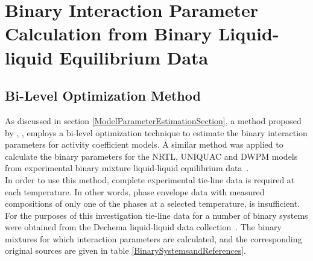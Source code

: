 
\section{Binary Interaction Parameter Calculation from Binary Liquid-liquid Equilibrium Data}
\subsection{Bi-Level Optimization Method}
								
As discussed in section \ref{ModelParameterEstimationSection}, a method proposed by \citeauthor{BilevelOptimization2}, \citeyear{BilevelOptimization2}, employs a bi-level optimization technique to estimate the binary interaction parameters for activity coefficient models. A similar method was applied to calculate the binary parameters for the NRTL, UNIQUAC and DWPM models from experimental binary mixture liquid-liquid equilibrium data~\cite{BilevelOptimization, BilevelOptimization2}.\\

In order to use this method, complete experimental tie-line data is required at each temperature. In other words, phase envelope data with measured compositions of only one of the phases at a selected temperature, is insufficient. For the purposes of this investigation tie-line data for a number of binary systems were obtained from the Dechema liquid-liquid data collection~\cite{Dechema}. The binary mixtures for which interaction parameters are calculated, and the corresponding original sources are given in table \ref{BinarySystemsandReferences}.\\

